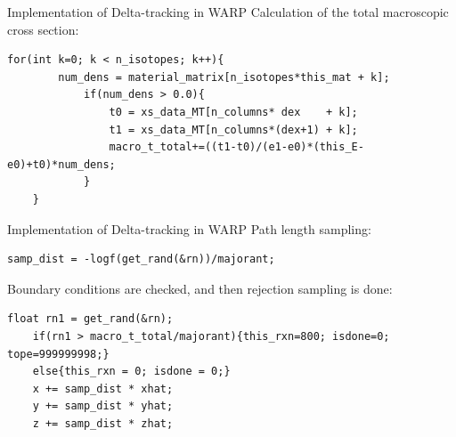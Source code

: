 \documentclass[xcolor=x11names, compress, handout]{beamer}
\renewcommand{\(}{\begin{columns}}
\renewcommand{\)}{\end{columns}}
\newcommand{\<}[1]{\begin{column}{#1}}
\renewcommand{\>}{\end{column}}
\begin{document}
\begin{frame}[fragile]{Implementation of Delta-tracking in WARP}
	Calculation of the total macroscopic cross section:
	\vspace{5 mm}
	\pause
	\begin{Verbatim}[fontsize=\footnotesize]
	for(int k=0; k < n_isotopes; k++){
	    num_dens = material_matrix[n_isotopes*this_mat + k];
	        if(num_dens > 0.0){
	            t0 = xs_data_MT[n_columns* dex    + k];
	            t1 = xs_data_MT[n_columns*(dex+1) + k];
	            macro_t_total+=((t1-t0)/(e1-e0)*(this_E-e0)+t0)*num_dens;
	        }
	}
	\end{Verbatim}
\end{frame}


\begin{frame}[fragile]{Implementation of Delta-tracking in WARP}
	Path length sampling:
	\vspace{2 mm}
	\pause
	\begin{Verbatim}[fontsize=\footnotesize]
	samp_dist = -logf(get_rand(&rn))/majorant;
	\end{Verbatim}
	\pause
	\vspace{2 mm}
	Boundary conditions are checked, and then rejection sampling is done:
	\pause
	\vspace{2 mm}
	\begin{Verbatim}[fontsize=\footnotesize]
	float rn1 = get_rand(&rn);
	if(rn1 > macro_t_total/majorant){this_rxn=800; isdone=0; tope=999999998;}
	else{this_rxn = 0; isdone = 0;}
	x += samp_dist * xhat;
	y += samp_dist * yhat;
	z += samp_dist * zhat;
	\end{Verbatim}
\end{frame}
\end{document}
